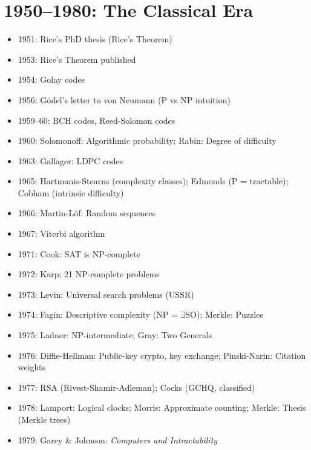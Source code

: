 \section{1950--1980: The Classical Era}
\begin{itemize}
\item 1951: Rice's PhD thesis (Rice's Theorem)
\item 1953: Rice's Theorem published
\item 1954: Golay codes
\item 1956: Gödel's letter to von Neumann (P vs NP intuition)
\item 1959--60: BCH codes, Reed-Solomon codes
\item 1960: Solomonoff: Algorithmic probability; Rabin: Degree of difficulty
\item 1963: Gallager: LDPC codes
\item 1965: Hartmanis-Stearns (complexity classes); Edmonds (P = tractable); Cobham (intrinsic difficulty)
\item 1966: Martin-Löf: Random sequences
\item 1967: Viterbi algorithm
\item 1971: Cook: SAT is NP-complete
\item 1972: Karp: 21 NP-complete problems
\item 1973: Levin: Universal search problems (USSR)
\item 1974: Fagin: Descriptive complexity (NP = $\exists$SO); Merkle: Puzzles
\item 1975: Ladner: NP-intermediate; Gray: Two Generals
\item 1976: Diffie-Hellman: Public-key crypto, key exchange; Pinski-Narin: Citation weights
\item 1977: RSA (Rivest-Shamir-Adleman); Cocks (GCHQ, classified)
\item 1978: Lamport: Logical clocks; Morris: Approximate counting; Merkle: Thesis (Merkle trees)
\item 1979: Garey \& Johnson: \emph{Computers and Intractability}
\end{itemize}

